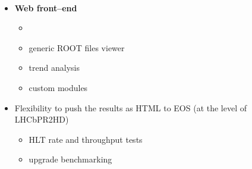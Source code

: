 {\begin{frame}[fragile]
\begin{columns}
 \\
\end{columns}

\begin{columns}
\begin{itemize}
\footnotesize
\item<4-> {\bf Web front--end} \href{http://lblhcbpr.cern.ch/}{}
\begin{itemize}
\scriptsize
\item<4-> \href{https://gitlab.cern.ch/lhcb-core/LHCbPR2FE}{}
\item<4-> generic ROOT files viewer
\item<4-> trend analysis
\item<4-> custom modules
\end{itemize}
\item<5-> Flexibility to push the results as HTML to EOS (at the level of LHCbPR2HD)
\begin{itemize}
\scriptsize
\item<5-> HLT rate and throughput tests
\item<5-> upgrade benchmarking
\end{itemize}
\end{itemize}
\begin{center}
\end{center}
\end{columns}


\end{frame}}
